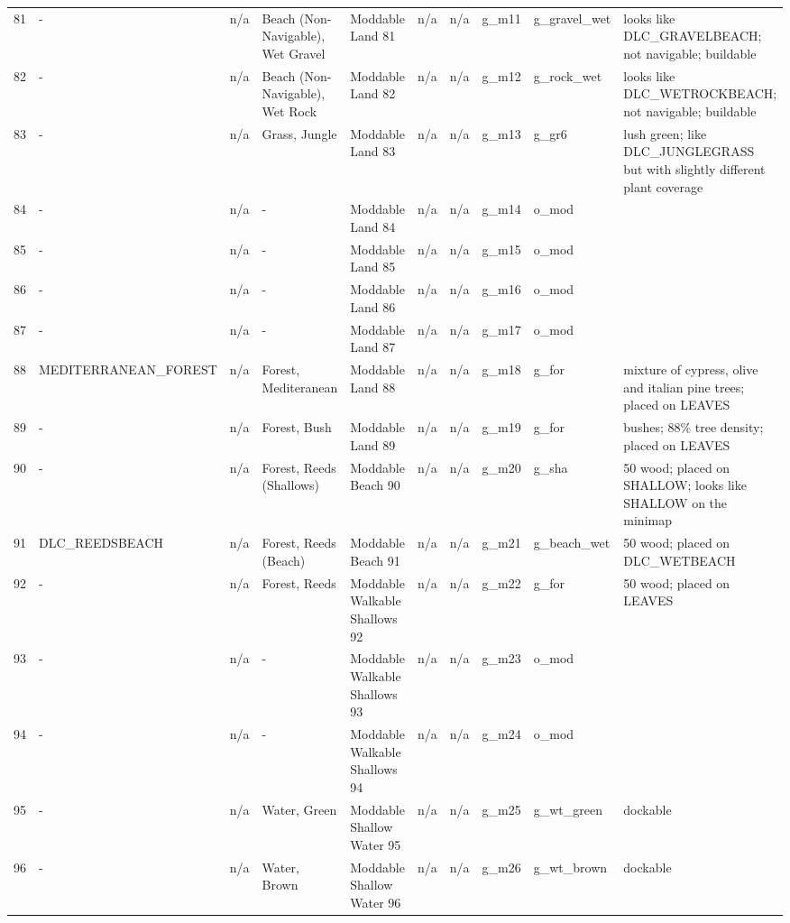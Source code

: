 \begin{appendices}
\begin{landscape}
\begin{longtable}{@{}p{5mm}|p{25mm}p{23mm}|p{14mm}p{14mm}p{14mm}p{14mm}|p{10mm}p{15mm}|p{45mm}@{}}
            81	& -	& n/a	& Beach (Non-Navigable), Wet Gravel	& Moddable Land 81	& n/a	& n/a	& g\_m11	& g\_gravel\_wet		& looks like DLC\_GRAVELBEACH; not navigable; buildable \\
            82	& -	& n/a	& Beach (Non-Navigable), Wet Rock	& Moddable Land 82	& n/a	& n/a	& g\_m12	& g\_rock\_wet		& looks like DLC\_WETROCKBEACH; not navigable; buildable \\
            83	& -	& n/a	& Grass, Jungle	& Moddable Land 83	& n/a	& n/a	& g\_m13	& g\_gr6		& lush green; like DLC\_JUNGLEGRASS but with slightly different plant coverage \\
            84	& -	& n/a	& -	& Moddable Land 84	& n/a	& n/a	& g\_m14	& o\_mod		&  \\
            85	& -	& n/a	& -	& Moddable Land 85	& n/a	& n/a	& g\_m15	& o\_mod		&  \\
            86	& -	& n/a	& -	& Moddable Land 86	& n/a	& n/a	& g\_m16	& o\_mod		&  \\
            87	& -	& n/a	& -	& Moddable Land 87	& n/a	& n/a	& g\_m17	& o\_mod		&  \\
            88	& MEDITERRANEAN\_FOREST	& n/a	& Forest, Mediteranean	& Moddable Land 88	& n/a	& n/a	& g\_m18	& g\_for		& mixture of cypress, olive and italian pine trees; placed on LEAVES \\
            89	& -	& n/a	& Forest, Bush	& Moddable Land 89	& n/a	& n/a	& g\_m19	& g\_for		& bushes; 88\% tree density; placed on LEAVES \\
            90	& -	& n/a	& Forest, Reeds (Shallows)	& Moddable Beach 90	& n/a	& n/a	& g\_m20	& g\_sha		& 50 wood; placed on SHALLOW; looks like SHALLOW on the minimap \\
            91	& DLC\_REEDSBEACH	& n/a	& Forest, Reeds (Beach)	& Moddable Beach 91	& n/a	& n/a	& g\_m21	& g\_beach\_wet		& 50 wood; placed on DLC\_WETBEACH \\
            92	& -	& n/a	& Forest, Reeds	& Moddable Walkable Shallows 92	& n/a	& n/a	& g\_m22	& g\_for		& 50 wood; placed on LEAVES \\
            93	& -	& n/a	& -	& Moddable Walkable Shallows 93	& n/a	& n/a	& g\_m23	& o\_mod		&  \\
            94	& -	& n/a	& -	& Moddable Walkable Shallows 94	& n/a	& n/a	& g\_m24	& o\_mod		&  \\
            95	& -	& n/a	& Water, Green	& Moddable Shallow Water 95	& n/a	& n/a	& g\_m25	& g\_wt\_green		& dockable \\
            96	& -	& n/a	& Water, Brown	& Moddable Shallow Water 96	& n/a	& n/a	& g\_m26	& g\_wt\_brown		& dockable \\

\end{longtable}
\end{landscape}
\end{appendices}
